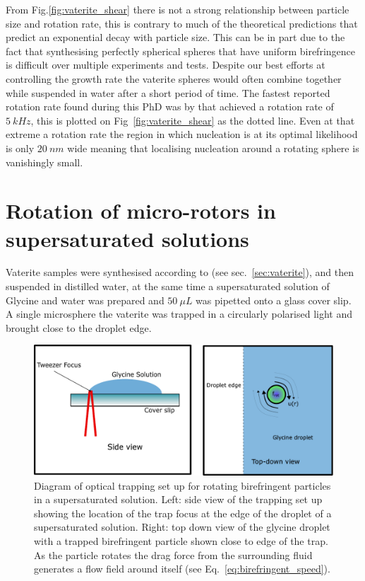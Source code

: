 From Fig.\ref{fig:vaterite_shear} there is not a strong relationship between
particle size and rotation rate, this is contrary to much of the theoretical
predictions that predict an exponential decay with particle size. This can
be in part due to the fact that synthesising perfectly spherical spheres that
have uniform birefringence is difficult over multiple experiments and tests. 
Despite our best efforts at controlling the growth rate the vaterite spheres
would often combine together while suspended in water after a short period of 
time. The fastest reported rotation rate found during this PhD was by \cite{Arita2016}
that achieved a rotation rate of $5\ kHz$, this is plotted on Fig~\ref{fig:vaterite_shear}
as the dotted line. Even at that extreme a rotation rate the region in which 
nucleation is at its optimal likelihood is only $20\ nm$ wide meaning that 
localising nucleation around a rotating sphere is vanishingly small. 

\section{Rotation of micro-rotors in supersaturated solutions}
Vaterite samples were synthesised according to \cite{Parkin2009, Bishop2004} 
(see sec.~\ref{sec:vaterite}), and then suspended in distilled 
water, at the same time a supersaturated solution of Glycine 
and water was prepared and $50\ \mu L$ was pipetted onto a 
glass cover slip. A single microsphere the vaterite was trapped 
in a circularly polarised light and brought close to the droplet 
edge.
\begin{figure}[h!]
	\centering
	\includegraphics[width=\linewidth]{vaterite_diagram.pdf}
	\caption{Diagram of optical trapping set up for rotating birefringent 
		particles in a supersaturated solution. Left: side view of the 
		trapping set up showing the location of the trap focus at the 
		edge of the droplet of a supersaturated solution. Right: top down 
		view of the glycine droplet with a trapped birefringent particle 
		shown close to edge of the trap. As the particle rotates the drag 
		force from the surrounding fluid generates a flow field around 
		itself (see Eq.~\ref{eq:birefringent_speed}).}
\end{figure}

